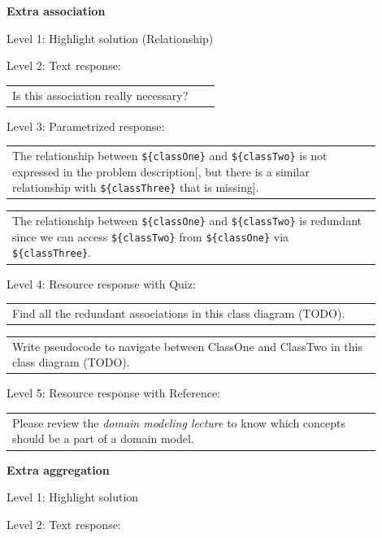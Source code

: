 \noindent \textbf{Extra association} \medskip

\noindent Level 1: Highlight solution (Relationship) \medskip

\noindent Level 2: Text response: \medskip

\begin{tabular}{|p{0.9\linewidth}}
Is this association really necessary?
\end{tabular} \medskip

\noindent Level 3: Parametrized response: \medskip

\begin{tabular}{|p{0.9\linewidth}}
The relationship between \verb|${classOne}| and \verb|${classTwo}| is not expressed in the problem description[, but there is a similar relationship with \verb|${classThree}| that is missing].
\end{tabular} \medskip

\begin{tabular}{|p{0.9\linewidth}}
The relationship between \verb|${classOne}| and \verb|${classTwo}| is redundant since we can access \verb|${classTwo}| from \verb|${classOne}| via \verb|${classThree}|.
\end{tabular} \medskip

\noindent Level 4: Resource response with Quiz: \medskip

\begin{tabular}{|p{0.9\linewidth}}
Find all the redundant associations in this class diagram (TODO).
\end{tabular} \medskip



\begin{tabular}{|p{0.9\linewidth}}
Write pseudocode to navigate between ClassOne and ClassTwo in this class diagram (TODO).
\end{tabular} \medskip

\noindent Level 5: Resource response with Reference: \medskip

\begin{tabular}{|p{0.9\linewidth}}
Please review the \textit{domain modeling lecture} to know which concepts should be a part of a domain model.
\end{tabular} \medskip


\noindent \textbf{Extra aggregation} \medskip

\noindent Level 1: Highlight solution  \medskip

\noindent Level 2: Text response: \medskip

